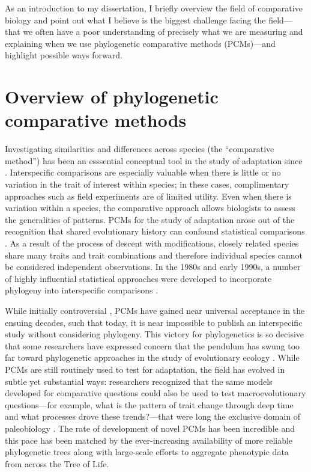 As an introduction to my dissertation, I briefly overview the field of comparative biology \citep[for a more comprehensive discussion, see][]{PennellHarmon} and point out what I believe is the biggest challenge facing the field---that we often have a poor understanding of precisely what we are measuring and explaining when we use phylogenetic comparative methods (PCMs)---and highlight possible ways forward.

\section{Overview of phylogenetic comparative methods}

Investigating similarities and differences across species (the ``comparative method'') has been an esssential conceptual tool in the study of adaptation since \citet{Darwin1859}. Interspecific comparisons are especially valuable when there is little or no variation in the trait of interest within species; in these cases, complimentary approaches such as field experiments are of limited utility. Even when there is variation within a species, the comparative approach allows biologists to assess the generalities of patterns. PCMs for the study of adaptation arose out of the recognition that shared evolutionary history can confound statistical comparisons \citep{HarveyPagel1991}. As a result of the process of descent with modifications, closely related species share many traits and trait combinations and therefore individual species cannot be considered independent observations. In the 1980s and early 1990s, a number of highly influential statistical approaches were developed to incorporate phylogeny into interspecific comparisons \citep{Ridley1983, Felsenstein1985, Grafen1989, Maddison1990, HarveyPagel1991, Lynch1991, Pagel1994}. 

While initially controversial \citep[e.g.,][]{Westoby1995}, PCMs have gained near universal acceptance in the ensuing decades, such that today, it is near impossible to publish an interspecific study without considering phylogeny. This victory for phylogenetics is so decisive that some researchers have expressed concern that the pendulum has swung too far toward phylogenetic approaches in the study of evolutionary ecology \citep{Losos2011}. While PCMs are still routinely used to test for adaptation, the field has evolved in subtle yet substantial ways: researchers recognized that the same models developed for comparative questions could also be used to test macroevolutionary questions---for example, what is the pattern of trait change through deep time and what processes drove these trends?---that were long the exclusive domain of paleobiology \citep{HansenMartins1996, Hansen1997, Schluter1997, Pagel1997, MooersSchluter1998, Pagel1999, Mooers1999}. The rate of development of novel PCMs has been incredible and this pace has been matched by the ever-increasing availability of more reliable phylogenetic trees along with large-scale efforts to aggregate phenotypic data from across the Tree of Life.

